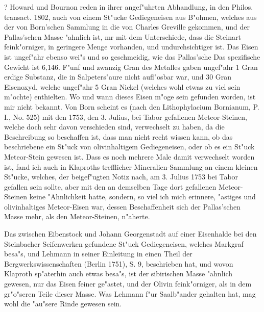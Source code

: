 \documentclass[a4paper, 11pt, oneside, polutonikogreek, german]{article}
\begin{document}
? Howard und Bournon reden in ihrer angef"uhrten Abhandlung, in den Philos. transact. 1802, auch von einem St"ucke Gediegeneisen aus B"ohmen, welches aus der von Born'schen Sammlung in die von Charles Greville gekommen, und der Pallas'schen Masse "ahnlich ist, mr mit dem Unterschiede, dass die Steinart feink"orniger, in geringere Menge vorhanden, und undurchsichtiger ist. Das Eisen ist ungef"ahr ebenso wei"s und so geschmeidig, wie das Pallas'sche Das spezifische Gewicht ist 6,146. F"unf und zwanzig Gran des Metalles gaben ungef"ahr 1 Gran erdige Substanz, die in Salpeters"aure nicht aufl"osbar war, und 30 Gran Eisenoxyd, welche ungef"ahr 5 Gran Nickel (welches wohl etwas zu viel sein m"ochte) enthielten. Wo und wann dieses Eisen m"oge sein gefunden worden, ist mir nicht bekannt. Von Born scheint es (nach den Lithophylacium Bornianum, P. I., No. 525) mit den 1753, den 3. Julius, bei Tabor gefallenen Meteor-Steinen, welche doch sehr davon verschieden sind, verwechselt zu haben, da die Beschreibung so beschaffen ist, dass man nicht recht wissen kann, ob das beschriebene ein St"uck von olivinhaltigem Gediegeneisen, oder ob es ein St"uck Meteor-Stein gewesen ist. Dass es noch mehrere Male damit verwechselt worden ist, fand ich auch in Klaproths trefflicher Mineralien-Sammlung an einem kleinen St"ucke, welches, der beigef"ugten Notiz nach, am 3. Julius 1753 bei Tabor gefallen sein sollte, aber mit den an demselben Tage dort gefallenen Meteor-Steinen keine "Ahnlichkeit hatte, sondern, so viel ich mich erinnere, "astiges und olivinhaltiges Meteor-Eisen war, dessen Beschaffenheit sich der Pallas'schen Masse mehr, als den Meteor-Steinen, n"aherte.

Das zwischen Eibenstock und Johann Georgenstadt auf einer Eisenhalde bei den Steinbacher Seifenwerken gefundene St"uck Gediegeneisen, welches Markgraf besa"s, und Lehmann in seiner Einleitung in einen Theil der Bergwerkswissenschaften (Berlin 1751), S. 9, beschrieben hat, und wovon Klaproth sp"aterhin auch etwas besa"s, ist der sibirischen Masse "ahnlich gewesen, nur das Eisen feiner ge"astet, und der Olivin feink"orniger, als in dem gr"o"seren Teile dieser Masse. Was Lehmann f"ur Saalb"ander gehalten hat, mag wohl die "au"sere Rinde gewesen sein.
\end{document}
